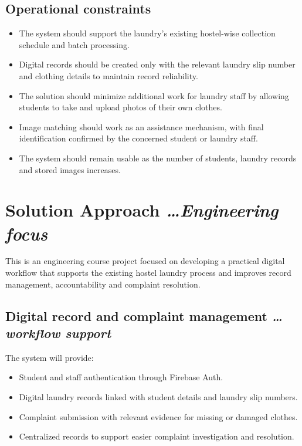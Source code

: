 \documentclass[11pt,a4paper]{article}
\newcommand{\BvrHint}[1]{%
  {\normalfont\normalsize\itshape\hfill #1}}
\begin{document}
\subsection{Operational constraints}
\begin{itemize}[leftmargin=0.7cm]
    \item The system should support the laundry's existing hostel-wise collection schedule and batch processing.
    
    \item Digital records should be created only with the relevant laundry slip number and clothing details to maintain record reliability.
    
    \item The solution should minimize additional work for laundry staff by allowing students to take and upload photos of their own clothes.
    
    \item Image matching should work as an assistance mechanism, with final identification confirmed by the concerned student or laundry staff.
    
    \item The system should remain usable as the number of students, laundry records and stored images increases.
\end{itemize}

\section{Solution Approach %
\BvrHint{\ldots Engineering focus}}

This is an engineering course project focused on developing a practical digital workflow that supports the existing hostel laundry process and improves record management, accountability and complaint resolution.

\subsection{Digital record and complaint management %
\BvrHint{\ldots workflow support}}
The system will provide:
\begin{itemize}[leftmargin=0.7cm]
    \item Student and staff authentication through Firebase Auth.
    \item Digital laundry records linked with student details and laundry slip numbers.
    \item Complaint submission with relevant evidence for missing or damaged clothes.
    \item Centralized records to support easier complaint investigation and resolution.
\end{itemize}
\end{document}
